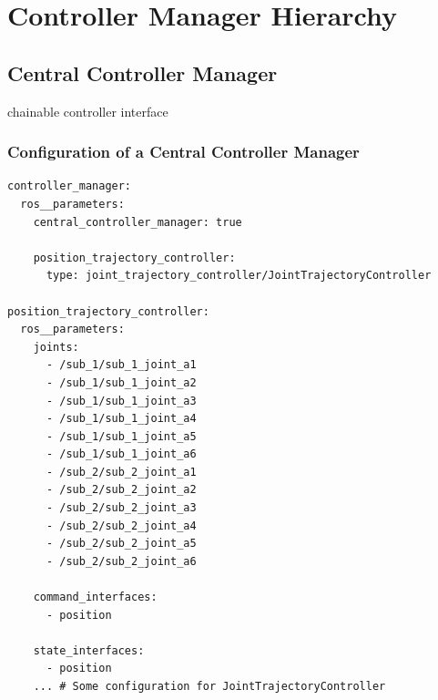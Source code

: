 \section{Controller Manager Hierarchy}

\subsection{Central Controller Manager}
chainable controller interface
\subsubsection{Configuration of a Central Controller Manager}
\lstset{language=yaml,basicstyle=\scriptsize}
\begin{lstlisting}[caption=Example configuration of a central controller manager with a joint trajecotry controller.,label=c5_l_central_controller_manager_config]
controller_manager:
  ros__parameters:
    central_controller_manager: true
    
    position_trajectory_controller:
      type: joint_trajectory_controller/JointTrajectoryController

position_trajectory_controller:
  ros__parameters:
    joints:
      - /sub_1/sub_1_joint_a1
      - /sub_1/sub_1_joint_a2
      - /sub_1/sub_1_joint_a3
      - /sub_1/sub_1_joint_a4
      - /sub_1/sub_1_joint_a5
      - /sub_1/sub_1_joint_a6
      - /sub_2/sub_2_joint_a1
      - /sub_2/sub_2_joint_a2
      - /sub_2/sub_2_joint_a3
      - /sub_2/sub_2_joint_a4
      - /sub_2/sub_2_joint_a5
      - /sub_2/sub_2_joint_a6

    command_interfaces:
      - position

    state_interfaces:
      - position
    ... # Some configuration for JointTrajectoryController 
\end{lstlisting}

